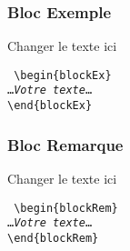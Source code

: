 \documentclass[aspectratio=169]{beamer}
\begin{document}
\begin{frame}
\frametitle{Bloc \og Exemple\fg}
\begin{blockEx}
Changer le texte ici
\end{blockEx}
\noindent\texttt{%
\textbackslash begin\{blockEx\}\\
\ldots\emph{Votre texte}\ldots\\
\textbackslash end\{blockEx\}
}%
\end{frame}
\begin{frame}
\frametitle{Bloc \og Remarque\fg}
\begin{blockRem}
Changer le texte ici
\end{blockRem}
\noindent\texttt{%
\textbackslash begin\{blockRem\}\\
\ldots\emph{Votre texte}\ldots\\
\textbackslash end\{blockRem\}}%
\end{frame}
\end{document}
